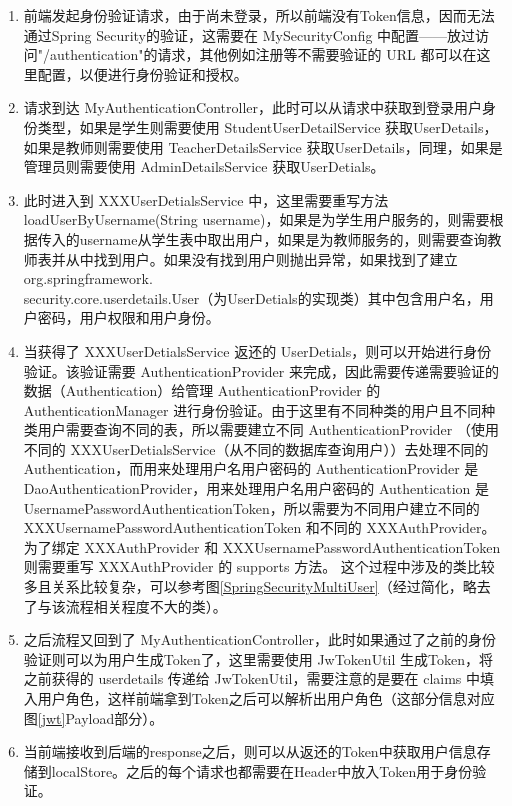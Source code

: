 \begin{enumerate}
  \item 前端发起身份验证请求，由于尚未登录，所以前端没有Token信息，因而无法通过Spring Security的验证，这需要在 MySecurityConfig 中配置——放过访问"/authentication"的请求，其他例如注册等不需要验证的 URL 都可以在这里配置，以便进行身份验证和授权。
  \item 请求到达 MyAuthenticationController，此时可以从请求中获取到登录用户身份类型，如果是学生则需要使用 StudentUserDetailService 获取UserDetails，如果是教师则需要使用 TeacherDetailsService 获取UserDetails，同理，如果是管理员则需要使用 AdminDetailsService 获取UserDetials。
  \item 此时进入到 XXXUserDetialsService 中，这里需要重写方法 loadUserByUsername(String username)，如果是为学生用户服务的，则需要根据传入的username从学生表中取出用户，如果是为教师服务的，则需要查询教师表并从中找到用户。如果没有找到用户则抛出异常，如果找到了建立 org.springframework.\\security.core.userdetails.User（为UserDetials的实现类）其中包含用户名，用户密码，用户权限和用户身份。
  \item 当获得了 XXXUserDetialsService 返还的 UserDetials，则可以开始进行身份验证。该验证需要 AuthenticationProvider 来完成，因此需要传递需要验证的数据（Authentication）给管理 AuthenticationProvider 的 AuthenticationManager 进行身份验证。由于这里有不同种类的用户且不同种类用户需要查询不同的表，所以需要建立不同 AuthenticationProvider （使用不同的 XXXUserDetialsService（从不同的数据库查询用户））去处理不同的 Authentication，而用来处理用户名用户密码的 AuthenticationProvider 是 DaoAuthenticationProvider，用来处理用户名用户密码的 Authentication 是 UsernamePasswordAuthenticationToken，所以需要为不同用户建立不同的 XXXUsernamePasswordAuthenticationToken 和不同的 XXXAuthProvider。为了绑定 XXXAuthProvider 和 XXXUsernamePasswordAuthenticationToken 则需要重写 XXXAuthProvider 的 supports 方法。
        这个过程中涉及的类比较多且关系比较复杂，可以参考图\ref{SpringSecurityMultiUser}（经过简化，略去了与该流程相关程度不大的类）。
  \item 之后流程又回到了 MyAuthenticationController，此时如果通过了之前的身份验证则可以为用户生成Token了，这里需要使用 JwTokenUtil 生成Token，将 之前获得的 userdetails 传递给 JwTokenUtil，需要注意的是要在 claims 中填入用户角色，这样前端拿到Token之后可以解析出用户角色（这部分信息对应图\ref{jwt}Payload部分）。
  \item 当前端接收到后端的response之后，则可以从返还的Token中获取用户信息存储到localStore。之后的每个请求也都需要在Header中放入Token用于身份验证。
\end{enumerate}
